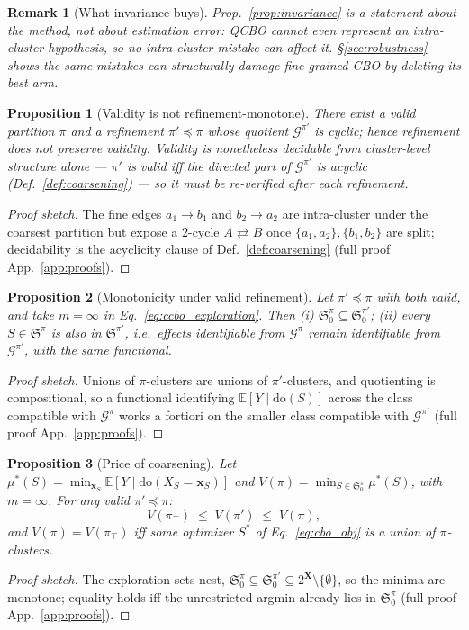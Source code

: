 \documentclass{article}
\newtheorem{proposition}{Proposition}
\newtheorem{remark}{Remark}
\newcommand{\E}{\mathbb{E}}
\renewcommand{\do}{\mathrm{do}}
\newcommand{\QCBO}{\textsc{QCBO}}
\newcommand{\Gq}{\mathcal{G}^{\pi}}
\newcommand{\ESpi}{\mathfrak{S}^{\pi}}
\begin{document}
\begin{remark}[What invariance buys]
\label{rem:structural_robustness}
Prop.~\ref{prop:invariance} is a statement about the \emph{method}, not
about estimation error: \QCBO{} cannot even represent an intra-cluster
hypothesis, so no intra-cluster mistake can affect it. \S\ref{sec:robustness}
shows the same mistakes can structurally damage fine-grained CBO by
deleting its best arm.
\end{remark}

\begin{proposition}[Validity is not refinement-monotone]
\label{prop:refinement_validity}
There exist a valid partition $\pi$ and a refinement $\pi'\preceq\pi$ whose
quotient $\mathcal{G}^{\pi'}$ is cyclic; hence refinement does not preserve
validity. Validity is nonetheless decidable from cluster-level structure
alone --- $\pi'$ is valid iff the directed part of $\mathcal{G}^{\pi'}$ is
acyclic (Def.~\ref{def:coarsening}) --- so it must be re-verified after each
refinement.
\end{proposition}
\begin{proof}[Proof sketch]
The fine edges $a_1\to b_1$ and $b_2\to a_2$ are intra-cluster under the
coarsest partition but expose a $2$-cycle $A\rightleftarrows B$ once
$\{a_1,a_2\},\{b_1,b_2\}$ are split; decidability is the acyclicity clause of
Def.~\ref{def:coarsening} (full proof App.~\ref{app:proofs}).
\end{proof}

\begin{proposition}[Monotonicity under valid refinement]
\label{prop:refinement}
Let $\pi' \preceq \pi$ with both valid, and take $m = \infty$ in
Eq.~\eqref{eq:ccbo_exploration}. Then (i) $\ESpi_0 \subseteq
\mathfrak{S}^{\pi'}_{0}$; (ii) every $S \in \ESpi$ is also in
$\mathfrak{S}^{\pi'}$, i.e.\ effects identifiable from $\Gq$ remain
identifiable from $\mathcal{G}^{\pi'}$, with the same functional.
\end{proposition}
\begin{proof}[Proof sketch]
Unions of $\pi$-clusters are unions of $\pi'$-clusters, and quotienting is
compositional, so a functional identifying $\E[Y\mid\do(S)]$ across the class
compatible with $\Gq$ works a fortiori on the smaller class compatible with
$\mathcal{G}^{\pi'}$ \citep{anand2023cdag} (full proof App.~\ref{app:proofs}).
\end{proof}

\begin{proposition}[Price of coarsening]
\label{prop:price}
Let $\mu^*(S) = \min_{\mathbf{x}_S} \E[Y \mid \do(X_S=\mathbf{x}_S)]$ and
$V(\pi) = \min_{S \in \ESpi_0} \mu^*(S)$, with $m=\infty$. For any valid
$\pi' \preceq \pi$:
\[
V(\pi_\top) \;\le\; V(\pi') \;\le\; V(\pi),
\]
and $V(\pi) = V(\pi_\top)$ iff some optimizer $S^*$ of
Eq.~\eqref{eq:cbo_obj} is a union of $\pi$-clusters.
\end{proposition}
\begin{proof}[Proof sketch]
The exploration sets nest, $\ESpi_0\subseteq\mathfrak{S}^{\pi'}_0\subseteq
2^{\mathbf{X}}\setminus\{\emptyset\}$, so the minima are monotone; equality
holds iff the unrestricted argmin already lies in $\ESpi_0$ (full proof
App.~\ref{app:proofs}).
\end{proof}
\end{document}

